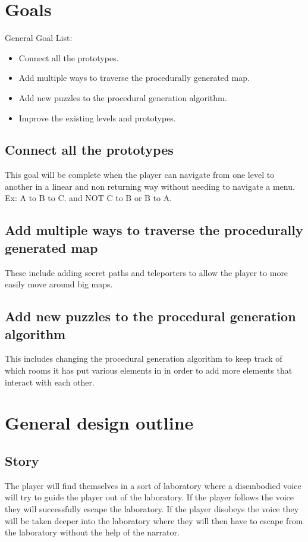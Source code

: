 \documentclass{article}
\begin{document}
\section{Goals}
General Goal List:
\begin{itemize}
    \item Connect all the prototypes.
    \item Add multiple ways to traverse the procedurally generated map.
    \item Add new puzzles to the procedural generation algorithm.
    \item Improve the existing levels and prototypes.
\end{itemize}
\subsection{Connect all the prototypes}
This goal will be complete when the player can navigate from one level to another in a linear and non returning
way without needing to navigate a menu. Ex: A to B to C. and NOT C to B or B to A. 
\subsection{Add multiple ways to traverse the procedurally generated map}
These include adding secret paths and teleporters to allow the player to more easily move around big maps.
\subsection{Add new puzzles to the procedural generation algorithm}
This includes changing the procedural generation algorithm to keep track of which rooms it has put various elements in
in order to add more elements that interact with each other.

\section{General design outline}
\subsection{Story}
The player will find themselves in a sort of laboratory where a disembodied voice will try 
to guide the player out of the laboratory. If the player follows the voice they will successfully
escape the laboratory. If the player disobeys the voice they will be taken deeper into the laboratory
where they will then have to escape from the laboratory without the help of the narrator. 
\end{document}
